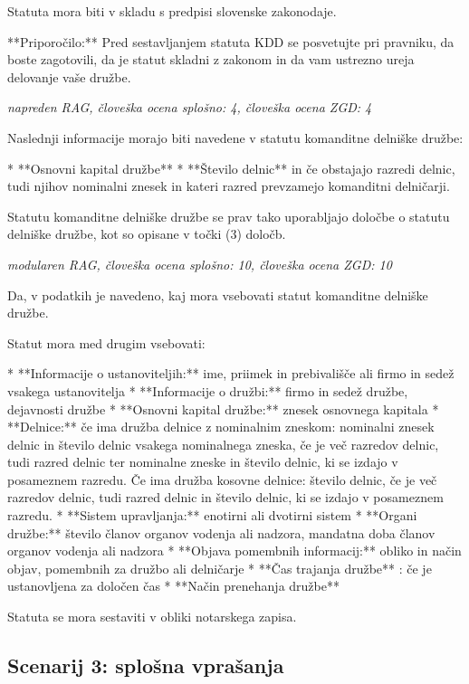 \documentclass[a4paper,12pt,openright]{book}
\begin{document}
Statuta mora biti v skladu s predpisi slovenske zakonodaje.


**Priporočilo:** Pred sestavljanjem statuta KDD se posvetujte pri pravniku, da boste zagotovili, da je statut skladni z zakonom in da vam ustrezno ureja delovanje vaše družbe.

\vspace{0.5cm}
\textit{napreden RAG, človeška ocena splošno: 4, človeška ocena ZGD: 4}

Naslednji informacije morajo biti navedene v statutu komanditne delniške družbe:

* **Osnovni kapital družbe**
* **Število delnic**  in če obstajajo razredi delnic, tudi njihov nominalni znesek in kateri razred prevzamejo komanditni delničarji.


Statutu komanditne delniške družbe se prav tako uporabljajo določbe o statutu delniške družbe, kot so opisane v točki (3) določb.

\vspace{0.5cm}
\textit{modularen RAG, človeška ocena splošno: 10, človeška ocena ZGD: 10}

Da, v podatkih je navedeno, kaj mora vsebovati statut komanditne delniške družbe.

Statut mora med drugim vsebovati:

* **Informacije o ustanoviteljih:** ime, priimek in prebivališče ali firmo in sedež vsakega ustanovitelja
* **Informacije o družbi:** firmo in sedež družbe, dejavnosti družbe
* **Osnovni kapital družbe:** znesek osnovnega kapitala
* **Delnice:** če ima družba delnice z nominalnim zneskom: nominalni znesek delnic in število delnic vsakega nominalnega zneska, če je več razredov delnic, tudi razred delnic ter nominalne zneske in število delnic, ki se izdajo v posameznem razredu. Če ima družba kosovne delnice: število delnic, če je več razredov delnic, tudi razred delnic in število delnic, ki se izdajo v posameznem razredu.
* **Sistem upravljanja:** enotirni ali dvotirni sistem
* **Organi družbe:** število članov organov vodenja ali nadzora, mandatna doba članov organov vodenja ali nadzora
* **Objava pomembnih informacij:** obliko in način objav, pomembnih za družbo ali delničarje
* **Čas trajanja družbe** : če je ustanovljena za določen čas
* **Način prenehanja družbe**


Statuta se mora sestaviti v obliki notarskega zapisa.


\subsection*{Scenarij 3: splošna vprašanja}
\end{document}
